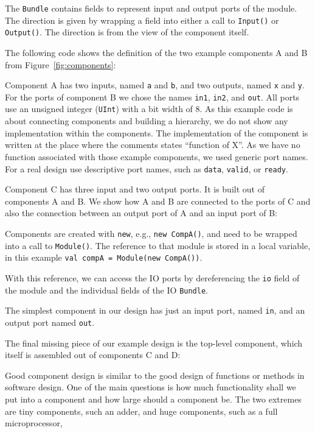 \documentclass[%
    10pt,
    headinclude, footexclude,
    openright, %
    notitlepage,
    cleardoubleempty,
    headsepline,
    pointlessnumbers,
    bibtotoc, idxtotoc,
    ]{scrbook}
\newcommand{\code}[1]{{\small{\texttt{#1}}}}
\begin{document}
The \code{Bundle} contains fields to represent input and output ports of
the module. The direction is given by wrapping a field into either a call to \code{Input()}
or \code{Output()}. The direction is from the view of the component itself.




The following code shows the definition of the two example components A and B from
Figure~\ref{fig:components}:


\noindent Component A has two inputs, named \code{a} and \code{b}, and two
outputs, named \code{x} and \code{y}. For the ports of component B
we chose the names \code{in1}, \code{in2}, and \code{out}.
All ports use an unsigned integer (\code{UInt}) with a bit width of 8.
As this example code is about connecting components and building a
hierarchy, we do not show any implementation within the components.
The implementation of the component is written at the place where
the comments states ``function of X''.
As we have no function associated with those example components,
we used generic port names. For a real design use descriptive
port names, such as \code{data}, \code{valid}, or \code{ready}.

Component C has three input and two output ports. It is built out of
components A and B. We show how A and B are connected to the ports
of C and also the connection between an output port of A and an
input port of B:


Components are created with \code{new}, e.g., \code{new CompA()}, and need to be wrapped
into a call to \code{Module()}. The reference to that module is stored in a local variable,
in this example \code{val compA = Module(new CompA())}.

With this reference, we can access the IO ports by dereferencing the \code{io} field of the module
and the individual fields of the IO \code{Bundle}.

The simplest component in our design has just an input port, named \code{in}, and
an output port named \code{out}.


The final missing piece of our example design is the top-level component, which itself
is assembled out of components C and D:


Good component design is similar to the good design of functions or methods in
software design. One of the main questions is how much functionality shall we put into
a component and how large should a component be. The two extremes are tiny
components, such an adder, and huge components, such as a full microprocessor,
\end{document}
